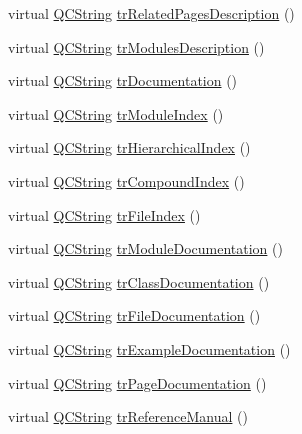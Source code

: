 \begin{DoxyCompactItemize}
virtual \mbox{\hyperlink{class_q_c_string}{Q\+C\+String}} \mbox{\hyperlink{class_translator_vietnamese_a5af7d4809475efb4bf35124cac69cd87}{tr\+Related\+Pages\+Description}} ()
\item 
virtual \mbox{\hyperlink{class_q_c_string}{Q\+C\+String}} \mbox{\hyperlink{class_translator_vietnamese_aa5c74a42b75f40466758fef49f526083}{tr\+Modules\+Description}} ()
\item 
virtual \mbox{\hyperlink{class_q_c_string}{Q\+C\+String}} \mbox{\hyperlink{class_translator_vietnamese_a0b4e0c558aa89cf04175fae0502712ca}{tr\+Documentation}} ()
\item 
virtual \mbox{\hyperlink{class_q_c_string}{Q\+C\+String}} \mbox{\hyperlink{class_translator_vietnamese_ae58da058fcd193d9f1398b4082cd748d}{tr\+Module\+Index}} ()
\item 
virtual \mbox{\hyperlink{class_q_c_string}{Q\+C\+String}} \mbox{\hyperlink{class_translator_vietnamese_a4a91a2919eb1a4122ef6ecf8a76c722b}{tr\+Hierarchical\+Index}} ()
\item 
virtual \mbox{\hyperlink{class_q_c_string}{Q\+C\+String}} \mbox{\hyperlink{class_translator_vietnamese_a1b6a6f720a294de34f35740fcbd051e7}{tr\+Compound\+Index}} ()
\item 
virtual \mbox{\hyperlink{class_q_c_string}{Q\+C\+String}} \mbox{\hyperlink{class_translator_vietnamese_a792242814890aa7d197b690fc1ced90c}{tr\+File\+Index}} ()
\item 
virtual \mbox{\hyperlink{class_q_c_string}{Q\+C\+String}} \mbox{\hyperlink{class_translator_vietnamese_a7a0ab13fb75ff8a434f841000cb65916}{tr\+Module\+Documentation}} ()
\item 
virtual \mbox{\hyperlink{class_q_c_string}{Q\+C\+String}} \mbox{\hyperlink{class_translator_vietnamese_a7a6d4bda9ee0a4c36ff8ccd323f74ef7}{tr\+Class\+Documentation}} ()
\item 
virtual \mbox{\hyperlink{class_q_c_string}{Q\+C\+String}} \mbox{\hyperlink{class_translator_vietnamese_a5ff58b67251c89c1855fca84af6a1837}{tr\+File\+Documentation}} ()
\item 
virtual \mbox{\hyperlink{class_q_c_string}{Q\+C\+String}} \mbox{\hyperlink{class_translator_vietnamese_a756889cf2e219a203a64ef5cc45fc829}{tr\+Example\+Documentation}} ()
\item 
virtual \mbox{\hyperlink{class_q_c_string}{Q\+C\+String}} \mbox{\hyperlink{class_translator_vietnamese_aa5dc0f6746aeaaa324af5f4f115385b9}{tr\+Page\+Documentation}} ()
\item 
virtual \mbox{\hyperlink{class_q_c_string}{Q\+C\+String}} \mbox{\hyperlink{class_translator_vietnamese_ae8a8381fbce744a0d36b8f681c9b3bc0}{tr\+Reference\+Manual}} ()

\end{DoxyCompactItemize}
